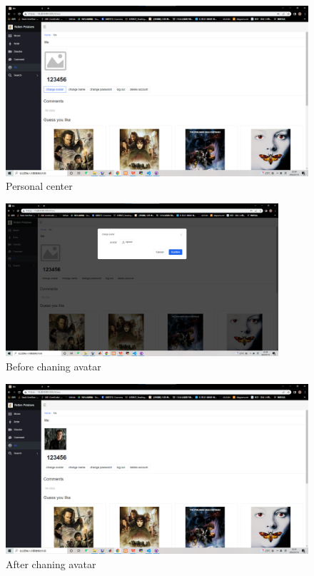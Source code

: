 \begin{CJK*}{UTF8}{gbsn}
    \begin{figure}[htbp]
    \centering
    \includegraphics[width=1\textwidth]{res_ps.png}
    \caption{Personal center}
    \end{figure}
    
    \begin{figure}[htbp]
    \centering
    \includegraphics[width=0.9\textwidth]{res_avatar1.png}
    \caption{Before chaning avatar}
    \end{figure}
    
    \begin{figure}[htbp]
    \centering
    \includegraphics[width=1\textwidth]{res_avatar2.png}
    \caption{After chaning avatar}
    \end{figure}
    

\end{CJK*}

